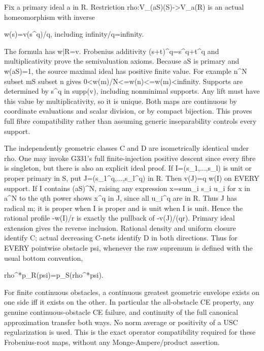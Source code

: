 \documentclass[11pt]{article}
\begin{document}
Fix a primary ideal a in R. Restriction rho:V\_(aS)(S)-\textgreater{}V\_a(R) is an actual homeomorphism with inverse

 w(s)=v(s\textasciicircum{}q)/q, including infinity/q=infinity.

The formula has w|R=v. Frobenius additivity (s+t)\textasciicircum{}q=s\textasciicircum{}q+t\textasciicircum{}q and multiplicativity prove the semivaluation axioms. Because aS is primary and w(aS)=1, the source maximal ideal has positive finite value. For example n\textasciicircum{}N subset mS subset n gives 0\textless{}w(m)/N\textless{}=w(n)\textless{}=w(m)\textless{}infinity. Supports are determined by s\textasciicircum{}q in supp(v), including nonminimal supports. Any lift must have this value by multiplicativity, so it is unique. Both maps are continuous by coordinate evaluations and scalar division, or by compact bijection. This proves full fibre compatibility rather than assuming generic inseparability controls every support.

The independently geometric classes C and D are isometrically identical under rho. One may invoke G331's full finite-injection positive descent since every fibre is singleton, but there is also an explicit ideal proof. If I=(s\_1,...,s\_l) is unit or proper primary in S, put J=(s\_1\textasciicircum{}q,...,s\_l\textasciicircum{}q) in R. Then v(J)=q w(I) on EVERY support. If I contains (aS)\textasciicircum{}N, raising any expression x=sum\_i s\_i u\_i for x in a\textasciicircum{}N to the qth power shows x\textasciicircum{}q in J, since all u\_i\textasciicircum{}q are in R. Thus J has radical m; it is proper when I is proper and is unit when I is unit. Hence the rational profile -w(I)/r is exactly the pullback of -v(J)/(qr). Primary ideal extension gives the reverse inclusion. Rational density and uniform closure identify C; actual decreasing C-nets identify D in both directions. Thus for EVERY pointwise obstacle psi, whenever the raw supremum is defined with the usual bottom convention,

 rho\textasciicircum{}*p\_R(psi)=p\_S(rho\textasciicircum{}*psi).

For finite continuous obstacles, a continuous greatest geometric envelope exists on one side iff it exists on the other. In particular the all-obstacle CE property, any genuine continuous-obstacle CE failure, and continuity of the full canonical approximation transfer both ways. No norm average or positivity of a USC regularization is used. This is the exact operator compatibility required for these Frobenius-root maps, without any Monge-Ampere/product assertion.
\end{document}
